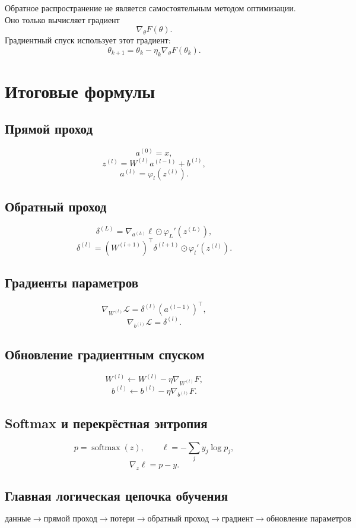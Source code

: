 \documentclass[12pt,a4paper]{article}
\theoremstyle{plain}
\theoremstyle{definition}
\theoremstyle{remark}
\newcommand{\softmax}{\operatorname{softmax}}
\begin{document}
Обратное распространение не является самостоятельным методом
оптимизации. Оно только вычисляет градиент
\[
    \nabla_\theta F(\theta).
\]
Градиентный спуск использует этот градиент:
\[
    \theta_{k+1}
    =
    \theta_k-\eta_k\nabla_\theta F(\theta_k).
\]

\section{Итоговые формулы}

\subsection*{Прямой проход}

\[
    a^{(0)}=x,
\]
\[
    z^{(l)}
    =
    W^{(l)}a^{(l-1)}+b^{(l)},
\]
\[
    a^{(l)}
    =
    \varphi_l(z^{(l)}).
\]

\subsection*{Обратный проход}

\[
    \delta^{(L)}
    =
    \nabla_{a^{(L)}}\ell
    \odot
    \varphi_L'(z^{(L)}),
\]
\[
    \delta^{(l)}
    =
    (W^{(l+1)})^\top
    \delta^{(l+1)}
    \odot
    \varphi_l'(z^{(l)}).
\]

\subsection*{Градиенты параметров}

\[
    \nabla_{W^{(l)}}\mathcal{L}
    =
    \delta^{(l)}(a^{(l-1)})^\top,
\]
\[
    \nabla_{b^{(l)}}\mathcal{L}
    =
    \delta^{(l)}.
\]

\subsection*{Обновление градиентным спуском}

\[
    W^{(l)}
    \gets
    W^{(l)}
    -
    \eta
    \nabla_{W^{(l)}}F,
\]
\[
    b^{(l)}
    \gets
    b^{(l)}
    -
    \eta
    \nabla_{b^{(l)}}F.
\]

\subsection*{Softmax и перекрёстная энтропия}

\[
    p=\softmax(z),
    \qquad
    \ell=-\sum_jy_j\log p_j,
\]
\[
    \nabla_z\ell=p-y.
\]

\subsection*{Главная логическая цепочка обучения}

\[
\boxed{
\text{данные}
\longrightarrow
\text{прямой проход}
\longrightarrow
\text{потери}
\longrightarrow
\text{обратный проход}
\longrightarrow
\text{градиент}
\longrightarrow
\text{обновление параметров}
}
\]
\end{document}
